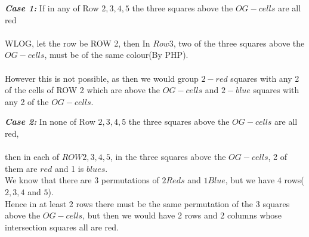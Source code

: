 \documentclass[11pt]{scrartcl}
\begin{document}
\textbf{\textit{Case 1:}} If in any of Row $2,3,4,5$ the three squares above the $OG-cells$ are all red\\\\
WLOG, let the row be ROW 2, then In $Row 3$, two of the three squares above the $OG-cells$, must be of the same colour(By PHP). \\\\However this is not possible, as then we would group $2 -red$ squares with any 2 of the cells of ROW 2 which are above the $OG-cells$ and $2-blue$ squares with any 2 of the $OG-cells$. 

\textbf{\textit{Case 2:}} In none of Row $2,3,4,5$ the three squares above the $OG-cells$ are all red,\\\\
then in each of $ROW 2,3,4,5$, in the three squares above the $OG-cells$, 2 of them are $red$ and 1 is $blues$. \\We know that there are 3 permutations of $2 Reds$ and $1 Blue$, but we have $4$ rows($2,3,4$ and $5$). \\
Hence in at least 2 rows there must be the same permutation of the 3 squares above the $OG-cells$, but then we would have 2 rows and 2 columns whose intersection squares all are red.
    
\end{document}
